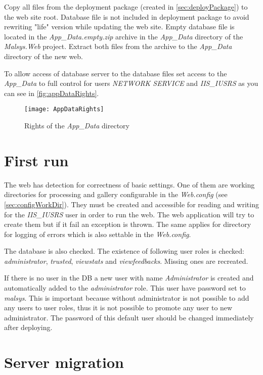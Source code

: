 Copy all files from the deployment package (created in \autoref{sec:deployPackage}) to the web site root.
Database file is not included in deployment package to avoid rewriting "life" version while updating the web site.
Empty database file is located in the \emph{App\_Data.empty.zip} archive in the \emph{App\_Data} directory of the \emph{Malsys.Web} project.
Extract both files from the archive to the \emph{App\_Data} directory of the new web.

To allow access of database server to the database files set access to the \emph{App\_Data} to full control for users \emph{NETWORK SERVICE} and \emph{IIS\_IUSRS} as you can see in \autoref{fig:appDataRights}.

\begin{figure}[h!]
	\centering
	\texttt{[image: AppDataRights]}
	\caption{Rights of the \emph{App\_Data} directory}
	\label{fig:appDataRights}
\end{figure}
	

\section{First run}

The web has detection for correctness of basic settings.
One of them are working directories for processing and gallery configurable in the \emph{Web.config} (see \autoref{sec:configWorkDir}).
They must be created and accessible for reading and writing for the \emph{IIS\_IUSRS} user in order to run the web.
The web application will try to create them but if it fail an exception is thrown.
The same applies for directory for logging of errors which is also settable in the \emph{Web.config}.

The database is also checked.
The existence of following user roles is checked: \emph{administrator}, \emph{trusted}, \emph{viewstats} and \emph{viewfeedbacks}.
Missing ones are recreated.

If there is no user in the DB a new user with name \emph{Administrator} is created and automatically added to the \emph{administrator} role.
This user have password set to \emph{malsys}.
This is important because without administrator is not possible to add any users to user roles, thus it is not possible to promote any user to new administrator.
The password of this default user should be changed immediately after deploying.



\section{Server migration}

